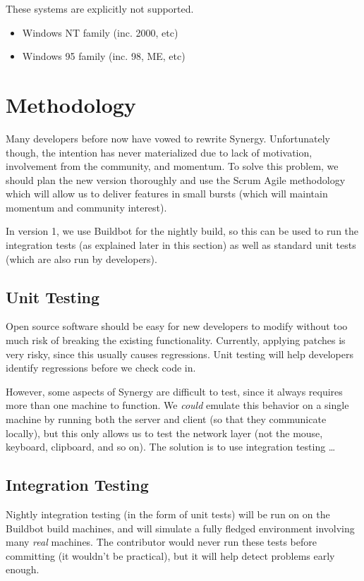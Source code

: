 \documentclass{article}
\begin{document}
These systems are explicitly not supported.

\begin{itemize}
  \item Windows NT family (inc. 2000, etc)
  \item Windows 95 family (inc. 98, ME, etc)
\end{itemize}

\section{Methodology}

Many developers before now have vowed to rewrite Synergy. Unfortunately though,
the intention has never materialized due to lack of motivation, involvement from
the community, and momentum.
To solve this problem, we should plan the new version thoroughly and use the
Scrum Agile methodology which will allow us to deliver features in small 
bursts (which will maintain momentum and community interest).

In version 1, we use Buildbot for the nightly build, so this can be used to run
the integration tests (as explained later in this section) as well as standard 
unit tests (which are also run by developers).

\subsection{Unit Testing}

Open source software should be easy for new developers to modify without too
much risk of breaking the existing functionality. Currently, applying patches 
is very risky, since this usually causes regressions. Unit testing will help 
developers identify regressions before we check code in.

However, some aspects of Synergy are difficult to test, since it always requires
more than one machine to function. We \textit{could} emulate this behavior on a 
single machine by running both the server and client (so that they communicate 
locally), but this only allows us to test the network layer (not the mouse,
keyboard, clipboard, and so on). The solution is to use integration testing
\ldots

\subsection{Integration Testing}

Nightly integration testing (in the form of unit tests) will be run on on the 
Buildbot build machines, and will
simulate a fully fledged environment involving many \textit{real} machines. The 
contributor would never run these tests before committing (it wouldn't be 
practical), but it will help detect problems early enough.
\end{document}
